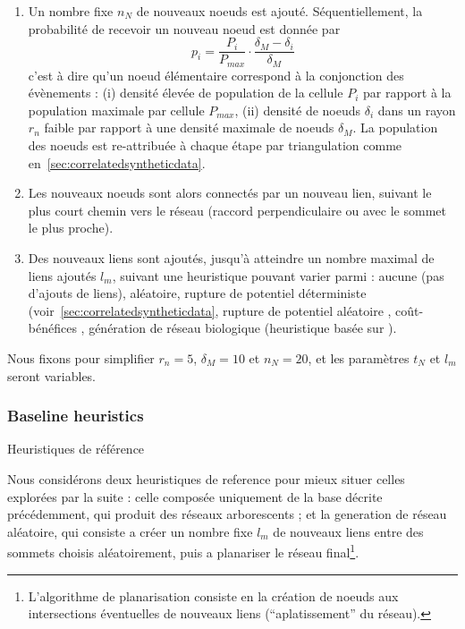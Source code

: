 \begin{enumerate}
	\item Un nombre fixe $n_N$ de nouveaux noeuds est ajouté. Séquentiellement, la probabilité de recevoir un nouveau noeud est donnée par
\[
p_i = \frac{P_i}{P_{max}} \cdot \frac{\delta_M - \delta_i}{\delta_M}
\]
c'est à dire qu'un noeud élémentaire correspond à la conjonction des évènements : (i) densité élevée de population de la cellule $P_i$ par rapport à la population maximale par cellule $P_{max}$, (ii) densité de noeuds $\delta_i$ dans un rayon $r_n$ faible par rapport à une densité maximale de noeuds $\delta_M$. La population des noeuds est re-attribuée à chaque étape par triangulation comme en~\ref{sec:correlatedsyntheticdata}.
	\item Les nouveaux noeuds sont alors connectés par un nouveau lien, suivant le plus court chemin vers le réseau (raccord perpendiculaire ou avec le sommet le plus proche).
	\item Des nouveaux liens sont ajoutés, jusqu'à atteindre un nombre maximal de liens ajoutés $l_{m}$, suivant une heuristique pouvant varier parmi :  aucune (pas d'ajouts de liens), aléatoire, rupture de potentiel déterministe (voir~\ref{sec:correlatedsyntheticdata}, rupture de potentiel aléatoire \cite{schmitt2014modelisation}, coût-bénéfices \cite{louf2013emergence}, génération de réseau biologique (heuristique basée sur \cite{tero2010rules}).
\end{enumerate}


Nous fixons pour simplifier $r_n = 5$, $\delta_M = 10$ et $n_N=20$, et les paramètres $t_N$ et $l_m$ seront variables.


\subsubsection{Baseline heuristics}{Heuristiques de référence}

Nous considérons deux heuristiques de reference pour mieux situer celles explorées par la suite : celle composée uniquement de la base décrite précédemment, qui produit des réseaux arborescents ; et la generation de réseau aléatoire, qui consiste a créer un nombre fixe $l_m$ de nouveaux liens entre des sommets choisis aléatoirement, puis a planariser le réseau final\footnote{L'algorithme de planarisation consiste en la création de noeuds aux intersections éventuelles de nouveaux liens (``aplatissement'' du réseau).}.


